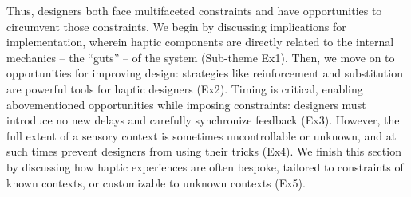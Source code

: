 \noindent 
Thus, designers both face multifaceted %
constraints and have opportunities to circumvent those constraints. %
We begin by discussing implications for implementation, wherein haptic components are directly related to the internal mechanics -- the ``guts'' -- of the system (Sub-theme Ex1).
Then, we move on to opportunities for improving design: strategies like reinforcement and substitution are powerful tools for haptic designers (Ex2). 
Timing is critical, enabling abovementioned opportunities while imposing constraints: designers must introduce no new delays and carefully synchronize feedback (Ex3).
However, the full extent of a sensory context is %
 sometimes uncontrollable or unknown, and at such times prevent designers from using their tricks (Ex4).
We finish this section by discussing how haptic experiences are often bespoke, 
tailored to constraints of known contexts, or customizable to unknown contexts (Ex5).



